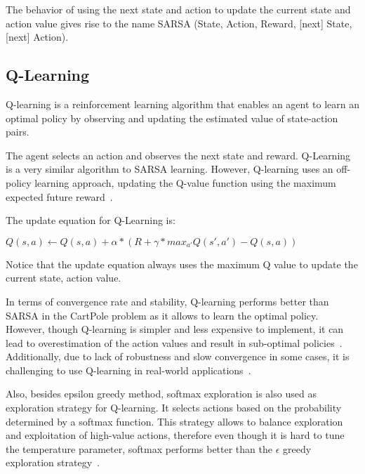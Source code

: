 The behavior of using the next state and action to update the current state and action value gives rise to the name SARSA (State, Action, Reward, [next] State, [next] Action).

\subsection{Q-Learning}
Q-learning is a reinforcement learning algorithm that enables an agent to learn an optimal policy by observing and updating the estimated value of state-action pairs.

The agent selects an action and observes the next state and reward.
Q-Learning is a very similar algorithm to SARSA learning. However, Q-learning uses an off-policy learning approach, updating the Q-value function using the maximum expected future reward~\citep{sutton2018reinforcement}.

The update equation for Q-Learning is:

$Q(s,a) \leftarrow Q(s,a) + \alpha*(R + \gamma*max_{a'}Q(s',a') - Q(s,a))$

Notice that the update equation always uses the maximum Q value to update the current state, action value.

In terms of convergence rate and stability, Q-learning performs better than SARSA in the CartPole problem as it allows to learn the optimal policy. However, though Q-learning is simpler and less expensive to implement, it can lead to overestimation of the action values and result in sub-optimal policies~\citep{nagendra2017comparison}. Additionally, due to lack of robustness and slow convergence in some cases, it is challenging to use Q-learning in real-world applications~\citep{manju2011analysis}. 

Also, besides epsilon greedy method, softmax exploration is also used as exploration strategy for Q-learning. It selects actions based on the probability determined by a softmax function. This strategy allows to balance exploration and exploitation of high-value actions, therefore even though it is hard to tune the temperature parameter, softmax performs better than the $\epsilon$ greedy exploration strategy~\citep{tijsma2016comparing}. 